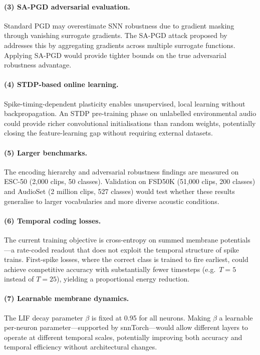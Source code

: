 \paragraph{(3) SA-PGD adversarial evaluation.}
Standard PGD may overestimate SNN robustness due to gradient masking through vanishing surrogate gradients. The SA-PGD attack proposed by \citet{wang2025sapgd} addresses this by aggregating gradients across multiple surrogate functions. Applying SA-PGD would provide tighter bounds on the true adversarial robustness advantage.

\paragraph{(4) STDP-based online learning.}
Spike-timing-dependent plasticity enables unsupervised, local learning without backpropagation. An STDP pre-training phase on unlabelled environmental audio could provide richer convolutional initialisations than random weights, potentially closing the feature-learning gap without requiring external datasets.

\paragraph{(5) Larger benchmarks.}
The encoding hierarchy and adversarial robustness findings are measured on ESC-50 (2,000 clips, 50 classes). Validation on FSD50K (51,000 clips, 200 classes) and AudioSet (2 million clips, 527 classes) would test whether these results generalise to larger vocabularies and more diverse acoustic conditions.

\paragraph{(6) Temporal coding losses.}
The current training objective is cross-entropy on summed membrane potentials---a rate-coded readout that does not exploit the temporal structure of spike trains. First-spike losses, where the correct class is trained to fire earliest, could achieve competitive accuracy with substantially fewer timesteps (e.g.\ $T = 5$ instead of $T = 25$), yielding a proportional energy reduction.

\paragraph{(7) Learnable membrane dynamics.}
The LIF decay parameter $\beta$ is fixed at 0.95 for all neurons. Making $\beta$ a learnable per-neuron parameter---supported by snnTorch---would allow different layers to operate at different temporal scales, potentially improving both accuracy and temporal efficiency without architectural changes.

